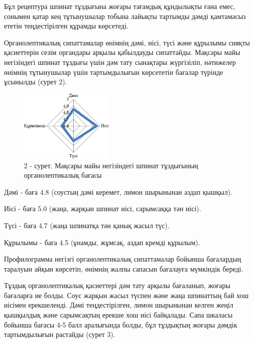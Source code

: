 \begin{multicols}{2}
Бұл рецептура шпинат тұздығына жоғары тағамдық құндылықты ғана емес,
сонымен қатар кең тұтынушылар тобына лайықты тартымды дәмді қамтамасыз
ететін теңдестірілген құрамды көрсетеді.

Органолептикалық сипаттамалар өнімнің дәмі, иісі, түсі және құрылымы
сияқты қасиеттерін сезім органдары арқылы қабылдауды сипаттайды. Мақсары
майы негізіндегі шпинат тұздығы үшін дәм тату сынақтары жүргізіліп,
нәтижелер өнімнің тұтынушылар үшін тартымдылығын көрсететін бағалар
түрінде ұсынылды (сурет 2).
\end{multicols}

\begin{figure}[H]
	\centering
	\includegraphics[width=0.4\textwidth]{media/pish3/image2}
	\caption*{2 - сурет. Мақсары майы негізіндегі шпинат тұздығының органолептикалық бағасы}
\end{figure}

\begin{multicols}{2}
Дәмі - баға 4.8 (соустың дәмі керемет, лимон шырынынан аздап қышқыл).

Иісі - баға 5.0 (жаңа, жарқын шпинат иісі, сарымсаққа тән иісі).

Түсі - баға 4.7 (жаңа шпинатқа тән қанық жасыл түс).

Құрылымы - баға 4.5 (ұнамды, жұмсақ, аздап кремді құрылым).

Профилограмма негізгі органолептикалық сипаттамалар бойынша бағалардың
таралуын айқын көрсетіп, өнімнің жалпы сапасын бағалауға мүмкіндік
береді.

Тұздық органолептикалық қасиеттері дәм тату арқылы бағаланып, жоғары
бағаларға ие болды. Соус жарқын жасыл түспен және жаңа шпинаттың бай хош
иісімен ерекшеленді. Дәмі теңдестірілген, лимон шырынынан келген жеңіл
қышқылдық және сарымсақтың ерекше хош иісі байқалады. Сапа шкаласы
бойынша бағасы 4-5 балл аралығында болды, бұл тұздықтың жоғары дәмдік
тартымдылығын растайды (сурет 3).
\end{multicols}

